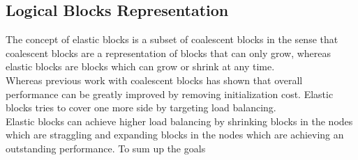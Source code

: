 \subsection{Logical Blocks Representation}
The concept of elastic blocks is a subset of coalescent blocks in the sense that coalescent blocks are a representation of blocks that can only grow, whereas elastic blocks are blocks which can grow or shrink at any time. \\
Whereas previous work with coalescent blocks has shown that overall performance can be greatly improved by removing initialization cost. Elastic blocks tries to cover one more side by targeting load balancing. \\
Elastic blocks can achieve higher load balancing by shrinking blocks in the nodes which are straggling and expanding blocks in the nodes which are achieving an outstanding performance. To sum up the goals